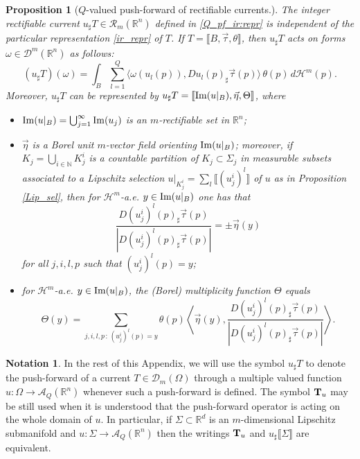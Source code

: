 \documentclass[a4paper,11pt,reqno]{amsart}
\newtheorem{proposition}[theorem]{Proposition}
\theoremstyle{definition}
\newtheorem{notazioni}[theorem]{Notation}
\numberwithin{equation}{section}
\numberwithin{subsection}{section}
\newcommand{\N}{\mathbb{N}}
\newcommand{\R}{\mathbb{R}}
\newcommand{\A}{\mathcal{A}}
\newcommand{\D}{\mathcal{D}}
\newcommand{\Rc}{\mathscr{R}}
\newcommand{\Ha}{\mathcal{H}}
\begin{document}
\begin{proposition}[$Q$-valued push-forward of rectifiable currents.]
The integer rectifiable current $u_{\sharp} T \in \Rc_{m}(\R^{n})$ defined in \eqref{Q_pf_ir:repr} is independent of the particular representation \eqref{ir_repr} of $T$. If $T = \llbracket B, \vec{\tau}, \theta \rrbracket$, then $u_{\sharp} T$ acts on forms $\omega \in \D^{m}(\R^{n})$ as follows:
\begin{equation} \label{Q_pf_ir:eq}
(u_{\sharp} T)(\omega) = \int_{B} \sum_{l=1}^{Q} \langle \omega(u_{l}(p)), Du_{l}(p)_{\sharp} \vec{\tau}(p) \rangle \, \theta(p) \, d\Ha^{m}(p).
\end{equation}
Moreover, $u_{\sharp} T$ can be represented by $u_{\sharp} T = \llbracket {\rm Im}(u|_{B}), \vec{\eta}, \Theta \rrbracket$, where
\begin{itemize}
\item[$(R1)'$] ${\rm Im}(u|_{B}) = \bigcup_{j=1}^{\infty} {\rm Im}(u_{j})$ is an $m$-rectifiable set in $\R^{n}$;

\item[$(R2)'$] $\vec{\eta}$ is a Borel unit $m$-vector field orienting ${\rm Im}(u|_{B})$; moreover, if $K_{j} = \bigcup_{i \in \N} K^{i}_{j}$ is a countable partition of $K_{j} \subset \Sigma_{j}$ in measurable subsets associated to a Lipschitz selection $u|_{K^{i}_{j}} = \sum_{l} \llbracket (u^{i}_{j})^{l} \rrbracket$ of $u$ as in Proposition \ref{Lip_sel}, then for $\Ha^{m}$-a.e. $y \in {\rm Im}(u|_{B})$ one has that
\begin{equation}
\frac{D(u^{i}_{j})^{l}(p)_{\sharp} \vec{\tau}(p)}{|D(u^{i}_{j})^{l}(p)_{\sharp} \vec{\tau}(p)|} = \pm \vec{\eta}(y)
\end{equation}
for all $j, i, l,p$ such that $(u^{i}_{j})^{l}(p) = y$;

\item[$(R3)'$] for $\Ha^{m}$-a.e. $y \in {\rm Im}(u|_{B})$, the (Borel) multiplicity function $\Theta$ equals
\begin{equation} 
\Theta(y) = \sum_{j,i,l,p \, \colon \, (u^{i}_{j})^{l}(p) = y} \theta(p) \left\langle \vec{\eta}(y), \frac{D(u^{i}_{j})^{l}(p)_{\sharp} \vec{\tau}(p)}{|D(u^{i}_{j})^{l}(p)_{\sharp} \vec{\tau}(p)|} \right\rangle.
\end{equation}
\end{itemize}
\end{proposition}

\begin{notazioni} \label{notazioni}
In the rest of this Appendix, we will use the symbol $u_{\sharp} T$ to denote the push-forward of a current $T \in \D_{m}(\Omega)$ through a multiple valued function $u \colon \Omega \to \A_{Q}(\R^{n})$ whenever such a push-forward is defined. The symbol ${\bf T}_{u}$ may be still used when it is understood that the push-forward operator is acting on the whole domain of $u$. In particular, if $\Sigma \subset \R^{d}$ is an $m$-dimensional Lipschitz submanifold and $u \colon \Sigma \to \A_{Q}(\R^{n})$ then the writings ${\bf T}_{u}$ and $u_{\sharp} \llbracket \Sigma \rrbracket$ are equivalent.
\end{notazioni}
\end{document}
